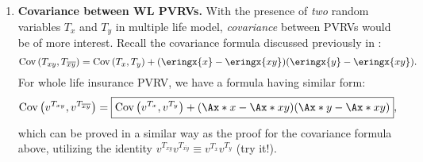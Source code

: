 \begin{enumerate}
\begin{itemize}
\item \emph{Endowment insurance:}
\begin{itemize}
\item \emph{(discrete)} \(\Ax{xy:\angl{n}}\overset{(m\le n)}{=}\Ax{\itop{\widehat{xy}}:\angl{m}}
+\Ex[m]{xy}\Ax{x+m:y+m:\angl{n-m}}\overset{(m=1)}{=}v\qx[]{xy}+v\px[]{xy}\Ax{x+1:y+1:\angl{n-1}}\).
\item \emph{(continuous)} \(\Ax*{\itop{\widehat{xy}}:\angl{n}}
\overset{(m\le n)}{=}\Ax*{\itop{\widehat{xy}}:\angl{m}}+\Ex[m]{xy}\Ax*{x+m:y+m:\angl{n-m}}\).
\end{itemize}
\end{itemize}
\begin{itemize}
\item \emph{Whole life annuity:}
\begin{itemize}
\item \emph{(discrete, due)} \(\ax**{xy}=\ax**{xy:\angl{n}}+\Ex[n]{xy}\ax**{x+n:y+n}
\overset{(n=1)}{=}\vc{1}+v\px{xy}\ax**{x+1:y+1}\).
\item \emph{(continuous)} \(\ax*{xy}=\ax*{xy:\angl{n}}+\Ex[n]{xy}\ax*{x+n:y+n}\).
\end{itemize}
\item \emph{Temporary life annuity:}
\begin{itemize}
\item \emph{(discrete, due)} \(\ax**{xy:\angl{n}}\overset{(m\le n)}{=}\ax**{xy:\angl{m}}+\Ex[m]{xy}\ax**{x+m:y+m:\angl{n-m}}
\overset{(m=1)}{=}\vc{1}+v\px{xy}\ax**{x+1:y+1:\angl{n-1}}\).
\item \emph{(continuous)} \(\ax*{xy:\angl{n}}=\ax*{xy:\angl{m}}+\Ex[m]{xy}\ax*{x+m:y+m:\angl{n-m}}\).
\end{itemize}
\end{itemize}
\item \label{it:cov-wl-pvrvs} \textbf{Covariance between WL PVRVs.} With the
presence of \emph{two} random variables \(T_x\) and \(T_y\) in multiple life
model, \emph{covariance} between PVRVs would be of more interest. Recall the
covariance formula discussed previously in :
\[
\cov{T_{xy}}{T_{\overline{xy}}}=\cov{T_x}{T_y}+(\eringx{x}-\eringx{xy})(\eringx{y}-\eringx{xy}).
\]
For whole life insurance PVRV, we have a formula having similar form:
\[
\cov{v^{T_{xy}}}{v^{T_{\overline{xy}}}}=\boxed{\cov{v^{T_x}}{v^{T_y}}+(\Ax*{x}-\Ax*{xy})(\Ax*{y}-\Ax*{xy})},
\]
which can be proved in a similar way as the proof for the covariance formula
above, utilizing the identity \(v^{T_{xy}}v^{T_{\overline{xy}}}\equiv
v^{T_{x}}v^{T_{y}}\) (try it!).


\end{enumerate}

